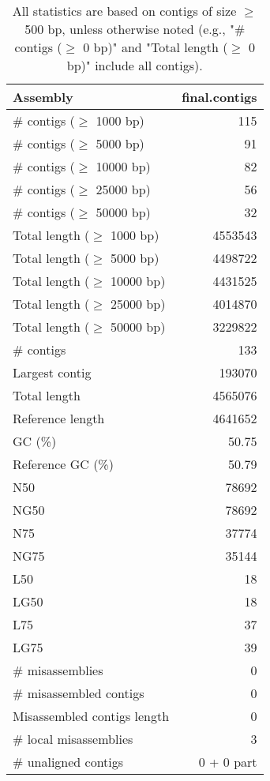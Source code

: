 \documentclass[12pt,a4paper]{article}
\begin{document}
\begin{table}[ht]
\begin{center}
\caption{All statistics are based on contigs of size $\geq$ 500 bp, unless otherwise noted (e.g., "\# contigs ($\geq$ 0 bp)" and "Total length ($\geq$ 0 bp)" include all contigs).}
\begin{tabular}{|l*{1}{|r}|}
\hline
Assembly & final.contigs \\ \hline
\# contigs ($\geq$ 1000 bp) & 115 \\ \hline
\# contigs ($\geq$ 5000 bp) & 91 \\ \hline
\# contigs ($\geq$ 10000 bp) & 82 \\ \hline
\# contigs ($\geq$ 25000 bp) & 56 \\ \hline
\# contigs ($\geq$ 50000 bp) & 32 \\ \hline
Total length ($\geq$ 1000 bp) & 4553543 \\ \hline
Total length ($\geq$ 5000 bp) & 4498722 \\ \hline
Total length ($\geq$ 10000 bp) & 4431525 \\ \hline
Total length ($\geq$ 25000 bp) & 4014870 \\ \hline
Total length ($\geq$ 50000 bp) & 3229822 \\ \hline
\# contigs & 133 \\ \hline
Largest contig & 193070 \\ \hline
Total length & 4565076 \\ \hline
Reference length & 4641652 \\ \hline
GC (\%) & 50.75 \\ \hline
Reference GC (\%) & 50.79 \\ \hline
N50 & 78692 \\ \hline
NG50 & 78692 \\ \hline
N75 & 37774 \\ \hline
NG75 & 35144 \\ \hline
L50 & 18 \\ \hline
LG50 & 18 \\ \hline
L75 & 37 \\ \hline
LG75 & 39 \\ \hline
\# misassemblies & 0 \\ \hline
\# misassembled contigs & 0 \\ \hline
Misassembled contigs length & 0 \\ \hline
\# local misassemblies & 3 \\ \hline
\# unaligned contigs & 0 + 0 part \\ \hline

\end{tabular}
\end{center}
\end{table}
\end{document}
